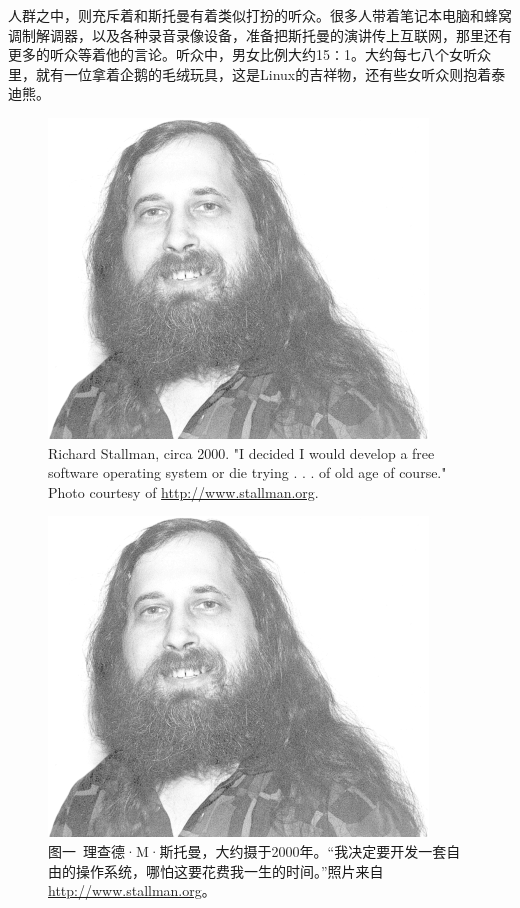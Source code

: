 \ifdefined\chs
人群之中，则充斥着和斯托曼有着类似打扮的听众。很多人带着笔记本电脑和蜂窝调制解调器，以及各种录音录像设备，准备把斯托曼的演讲传上互联网，那里还有更多的听众等着他的言论。听众中，男女比例大约15∶1。大约每七八个女听众里，就有一位拿着企鹅的毛绒玩具，这是Linux的吉祥物，还有些女听众则抱着泰迪熊。
\fi

\ifdefined\vone
\ifdefined\eng
\begin{figure}[ht] \centering
  \includegraphics[width=\textwidth]{free_0201}
  \caption{Richard Stallman, circa 2000. "I decided I would develop a free software operating system or die trying . . . of old age of course." Photo courtesy of \url{http://www.stallman.org}.}
\end{figure}
\fi

\ifdefined\chs
\begin{figure}[ht] \centering
  \includegraphics[width=\textwidth]{free_0201}
  \caption{图一\ 理查德·M·斯托曼，大约摄于2000年。``我决定要开发一套自由的操作系统，哪怕这要花费我一生的时间。''照片来自\url{http://www.stallman.org}。}
\end{figure}
\fi
\fi

